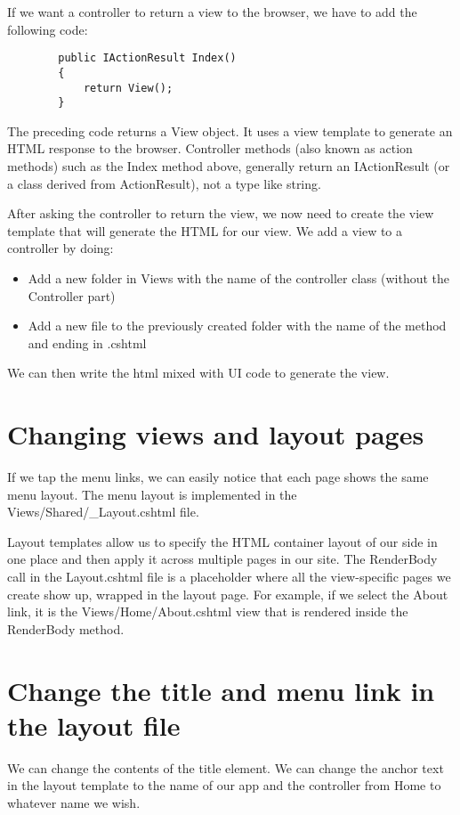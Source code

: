 \documentclass{report}
\begin{document}
    If we want a controller to return a view to the browser, we have to add
    the following code:
    
    \lstset{style=sharpc}
    \begin{lstlisting}
        public IActionResult Index()
        {
            return View();
        }
    \end{lstlisting}

    The preceding code returns a View object. It uses a view template to
    generate an HTML response to the browser. Controller methods (also known as
    action methods) such as the Index method above, generally return an IActionResult
    (or a class derived from ActionResult), not a type like string.

    After asking the controller to return the view, we now need to create
    the view template that will generate the HTML for our view. We add a
    view to a controller by doing:
    \begin{itemize}
        \item Add a new folder in Views with the name of the controller class
        (without the Controller part)
        \item Add a new file to the previously created folder with the name
        of the method and ending in .cshtml
    \end{itemize}

    We can then write the html mixed with UI code to generate the view.

    \section{Changing views and layout pages}
    If we tap the menu links, we can easily notice that each page shows the
    same menu layout. The menu layout is implemented in the
    Views/Shared/_Layout.cshtml file.

    Layout templates allow us to specify the HTML container layout of our side in one
    place and then apply it across multiple pages in our site. The RenderBody call in
    the Layout.cshtml file is a placeholder where all the view-specific pages we create
    show up, wrapped in the layout page. For example, if we select the About link,
    it is the Views/Home/About.cshtml view that is rendered inside the RenderBody method.

    \section{Change the title and menu link in the layout file}
    We can change the contents of the title element. We can change the anchor text in the
    layout template to the name of our app and the controller from Home to whatever name we wish.
\end{document}
